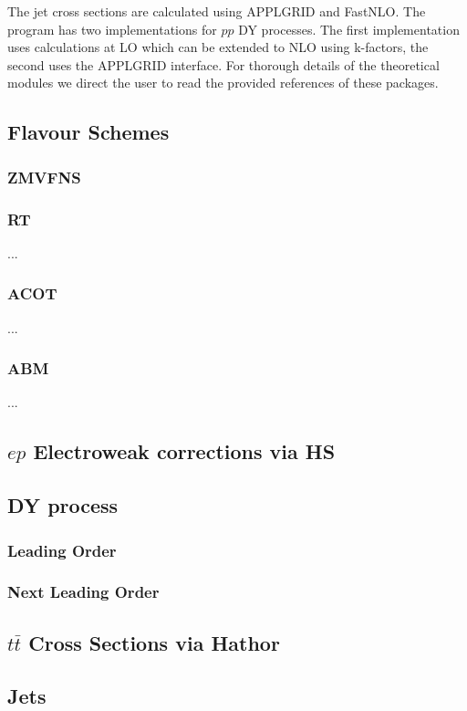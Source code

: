 \documentclass[11pt,a4paper]{article}
\begin{document}
The jet cross sections
are calculated using APPLGRID and FastNLO. The program has two implementations
for $pp$  DY processes. The first implementation uses
calculations at LO which can be extended to NLO using k-factors,
the second uses the APPLGRID interface.
For thorough details of the theoretical modules we direct the user to read the provided  references of these packages.


\subsection{Flavour Schemes}
\subsubsection{ZMVFNS}
\subsubsection{RT}
... 
\subsubsection{ACOT}
...
\subsubsection{ABM}
...
\subsection{$ep$ Electroweak corrections via HS}
\subsection{DY process}
\subsubsection{Leading Order}
\subsubsection{Next Leading Order}
\subsection{$t\bar{t}$ Cross Sections via Hathor}
\subsection{Jets}
\end{document}

